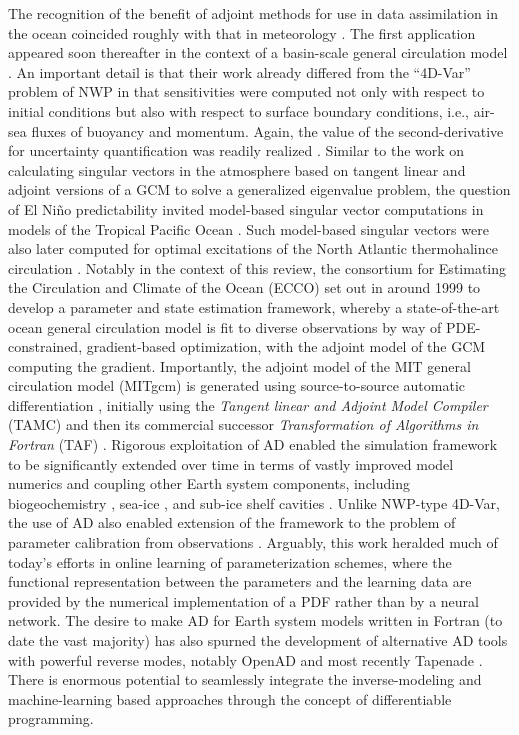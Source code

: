 The recognition of the benefit of adjoint methods for use in data assimilation in the ocean coincided roughly with that in meteorology \cite{Thacker:1988kp,Thacker:1988ed}. 
The first application appeared soon thereafter in the context of a basin-scale general circulation model \cite{Tziperman.1989,Tziperman:1992hg,Tziperman:1992jw}. 
An important detail is that their work already differed from the ``4D-Var'' problem of NWP in that sensitivities were computed not only with respect to initial conditions but also with respect to surface boundary conditions, i.e., air-sea fluxes of buoyancy and momentum.
Again, the value of the second-derivative for uncertainty quantification was readily realized \cite{Thacker:1989jf}.
Similar to the work on calculating singular vectors in the atmosphere based on tangent linear and adjoint versions of a GCM to solve a generalized eigenvalue problem, the question of El Ni\~no predictability invited model-based singular vector computations in models of the Tropical Pacific Ocean \cite{Moore.1997ah,Moore.1997}.
Such model-based singular vectors were also later computed for optimal excitations of the North Atlantic thermohalince circulation \cite{Zanna.2010,Zanna:2011ge,Zanna:2012dw}.
Notably in the context of this review, the consortium for Estimating the Circulation and Climate of the Ocean (ECCO) \cite{Stammer.2002} set out in around 1999 to develop a parameter and state estimation framework, whereby a state-of-the-art ocean general circulation model is fit to diverse observations by way of PDE-constrained, gradient-based optimization, with the adjoint model of the GCM computing the gradient.
Importantly, the adjoint model of the MIT general circulation model (MITgcm) is generated using source-to-source automatic differentiation \cite{Marotzke:1999, Heimbach.2005}, initially using the \textit{Tangent linear and Adjoint Model Compiler} (TAMC)\cite{Giering:1998in} and then its commercial successor \textit{Transformation of Algorithms in Fortran} (TAF) \cite{Giering.2006}.
Rigorous exploitation of AD enabled the simulation framework to be significantly extended over time in terms of vastly improved model numerics \cite{Forget.2015m9i} and coupling other Earth system components, including biogeochemistry \cite{Dutkiewicz:2006gw}, sea-ice \cite{Heimbach:2010fz}, and sub-ice shelf cavities \cite{Heimbach:2012iu}.
Unlike NWP-type 4D-Var, the use of AD also enabled extension of the framework to the problem of parameter calibration from observations \cite{Ferreira.2005,Stammer:2005dw,Liu:2012jd}. 
Arguably, this work heralded much of today's efforts in online learning of parameterization schemes, where the functional representation between the parameters and the learning data are provided by the numerical implementation of a PDF rather than by a neural network.
The desire to make AD for Earth system models written in Fortran (to date the vast majority) has also spurned the development of alternative AD tools with powerful reverse modes, notably OpenAD \cite{Utke:2008ko} and most recently Tapenade \cite{Hascoet.2013,Gaikwad.2023,Gaikwad.2024}.
There is enormous potential to seamlessly integrate the inverse-modeling and machine-learning based approaches through the concept of differentiable programming.

